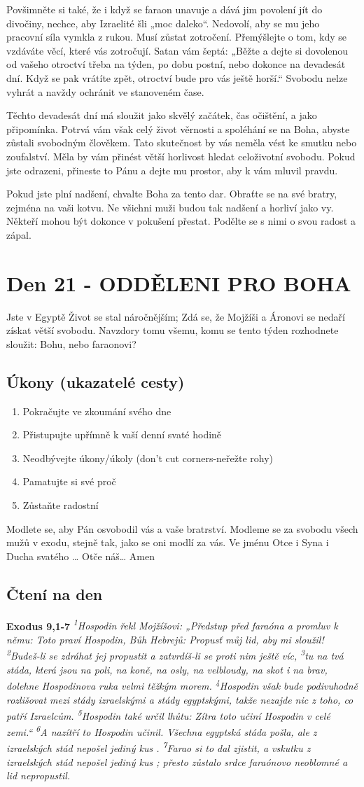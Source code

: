\documentclass[11pt]{article}
\newcommand{\zacatekTretiTyden}{
  Jste v Egyptě \newline
  Život se stal náročnějším; Zdá se, že Mojžíši a Áronovi se nedaří získat větší svobodu. Navzdory tomu všemu,
komu se tento týden rozhodnete sloužit: Bohu, nebo faraonovi?

\subsection*{Úkony (ukazatelé cesty)}
\begin{enumerate}
  \item Pokračujte ve zkoumání svého dne
  \item Přistupujte upřímně k vaší denní svaté hodině
  \item Neodbývejte úkony/úkoly (don’t cut corners-neřežte rohy)
  \item Pamatujte si své proč
  \item Zůstaňte radostní
\end{enumerate}
Modlete se, aby Pán osvobodil vás a vaše bratrství. \newline
Modleme se za svobodu všech mužů v exodu, stejně tak, jako se oni modlí za vás.\newline
Ve jménu Otce i Syna i Ducha svatého …  Otče náš… Amen
}
\begin{document}
Povšimněte si také, že i když se faraon unavuje a dává jim povolení jít do divočiny, nechce, aby Izraelité
šli „moc daleko“. Nedovolí, aby se mu jeho pracovní síla vymkla z rukou. Musí zůstat zotročení.
Přemýšlejte o tom, kdy se vzdáváte věcí, které vás zotročují. Satan vám šeptá: „Běžte a dejte si dovolenou
od vašeho otroctví třeba na týden, po dobu postní, nebo dokonce na devadesát dní. Když se pak vrátíte
zpět, otroctví bude pro vás ještě horší.“ Svobodu nelze vyhrát a navždy ochránit ve stanoveném čase.

Těchto devadesát dní má sloužit jako skvělý začátek, čas očištění, a jako připomínka. Potrvá vám však
celý život věrnosti a spoléhání se na Boha, abyste zůstali svobodným člověkem.
Tato skutečnost by vás neměla vést ke smutku nebo zoufalství. Měla by vám přinést větší horlivost hledat
celoživotní svobodu. Pokud jste odrazeni, přineste to Pánu a dejte mu prostor, aby k vám mluvil pravdu.

Pokud jste plní nadšení, chvalte Boha za tento dar. Obraťte se na své bratry, zejména na vaši kotvu. Ne
všichni muži budou tak nadšení a horliví jako vy. Někteří mohou být dokonce v pokušení přestat. Podělte
se s nimi o svou radost a zápal.

\newpage
\section{Den 21 - ODDĚLENI PRO BOHA}
\zacatekTretiTyden
\subsection*{Čtení na den}
\textbf{Exodus 9,1-7}
\newline
\textit{
\textsuperscript{1}Hospodin řekl Mojžíšovi: „Předstup před faraóna a promluv k němu: Toto praví Hospodin, Bůh Hebrejů: Propusť můj lid, aby mi sloužil!
\textsuperscript{2}Budeš-li se zdráhat jej propustit a zatvrdíš-li se proti nim ještě víc,
\textsuperscript{3}tu na tvá stáda, která jsou na poli, na koně, na osly, na velbloudy, na skot i na brav, dolehne Hospodinova ruka velmi těžkým morem.
\textsuperscript{4}Hospodin však bude podivuhodně rozlišovat mezi stády izraelskými a stády egyptskými, takže nezajde nic z toho, co patří Izraelcům.
\textsuperscript{5}Hospodin také určil lhůtu: Zítra toto učiní Hospodin v celé zemi.“
\textsuperscript{6}A nazítří to Hospodin učinil. Všechna egyptská stáda pošla, ale z izraelských stád nepošel jediný kus .
\textsuperscript{7}Farao si to dal zjistit, a vskutku z izraelských stád nepošel jediný kus ; přesto zůstalo srdce faraónovo neoblomné a lid nepropustil.
  }
\end{document}
